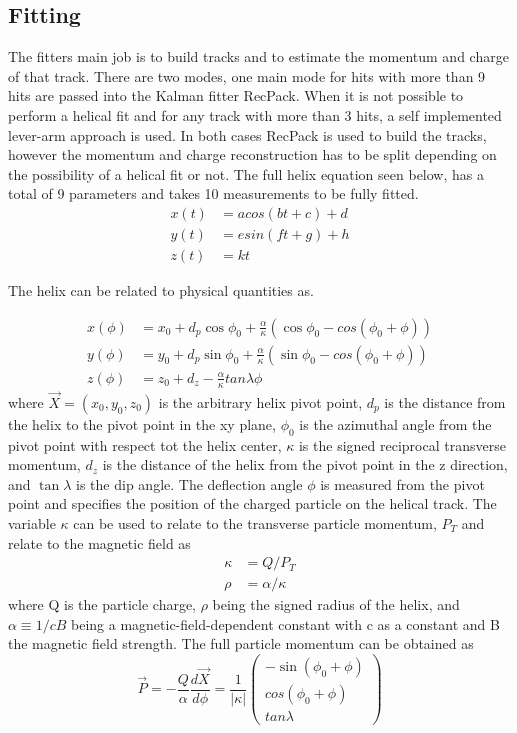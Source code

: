 \subsection{Fitting}
The fitters main job is to build tracks and to estimate the momentum and charge of that track. There are two modes, one main mode for hits with more than 9 hits are passed into the Kalman fitter RecPack. When it is not possible to perform a helical fit and for any track with more than 3 hits, a self implemented lever-arm approach is used. In both cases RecPack is used to build the tracks, however the momentum and charge reconstruction has to be split depending on the possibility of a helical fit or not. The full helix equation seen below, has a total of 9 parameters and takes 10 measurements to be fully fitted.  
\begin{align}
x(t) &= acos(bt+c)+d\\
y(t) &= esin(ft+g) + h\\
z(t) &= kt
\end{align}

The helix can be related to physical quantities as.

\begin{align}
x(\phi) &= x_0 + d_p \cos \phi_0 + \frac{\alpha}{\kappa}(\cos \phi_0 - cos(\phi_0 + \phi))\\ 
y(\phi) &= y_0 + d_p \sin \phi_0 + \frac{\alpha}{\kappa}(\sin \phi_0 - cos(\phi_0 + \phi))\\
z(\phi) &= z_0 + d_z - \frac{\alpha}{\kappa} tan \lambda \phi
\end{align}
where $\vec{X} = (x_0, y_0, z_0)$ is the arbitrary helix pivot point, $d_p$ is the distance from the helix to the pivot point in the xy plane, $\phi_0$ is the azimuthal angle from the pivot point with respect tot the helix center, $\kappa$ is the signed reciprocal transverse momentum, $d_z$ is the distance of the helix from the pivot point in the z direction, and $\tan\lambda$ is the dip angle. The deflection angle $\phi$ is measured from the pivot point and specifies the position of the charged particle on the helical track. The variable $\kappa$ can be used to relate to the transverse particle momentum, $P_T$ and relate to the magnetic field as 
\begin{align}
 \kappa &=  Q/P_T \\  
 \rho &=  \alpha/\kappa
 \end{align}
where Q is the particle charge, $\rho$ being the signed radius of the helix, and $\alpha \equiv 1/c B$ being a magnetic-field-dependent constant with c as a constant and B the magnetic field strength. The full particle momentum can be obtained as 
\begin{equation}
\vec{P} = - \frac{Q}{\alpha} \frac{d\vec{X}}{d\phi} = \frac{1}{|\kappa |} 
 \begin{pmatrix}
 -\sin(\phi_0 + \phi)\\
 cos(\phi_0 + \phi)\\
 tan\lambda
 \end{pmatrix}
\end{equation}

